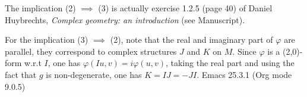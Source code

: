 \documentclass[11pt]{article}
\begin{document}
The implication (2) \(\implies\) (3) is actually exercise 1.2.5 (page 40) of Daniel Huybrechts,
\emph{Complex geometry: an introduction} (see Manuscript).

For the implication (3) \(\implies\) (2), note that the real and imaginary part of \(\varphi\) are parallel,
they correspond to complex structures \(J\) and \(K\) on \(M\). Since \(\varphi\) is a (2,0)-form w.r.t
\(I\), one has \(\varphi(Iu, v) = i\varphi(u,v)\), taking the real part and using the fact that \(g\) is
non-degenerate, one has \(K = IJ = -JI\).
Emacs 25.3.1 (Org mode 9.0.5)
\end{document}
